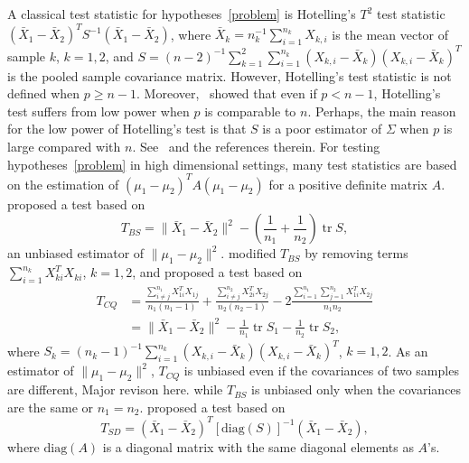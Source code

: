 \documentclass[review]{elsarticle}
\DeclareMathOperator{\mytr}{tr}
\theoremstyle{plain}
\theoremstyle{definition}
\theoremstyle{remark}
\begin{document}
A classical test statistic for hypotheses~\eqref{problem} is Hotelling's $T^2$ test  statistic ${(\bar{X}_1-\bar{X}_2)}^T S^{-1}(\bar{X}_1-\bar{X}_2)$, where $\bar{X}_k=n_k^{-1}\sum_{i=1}^{n_k}X_{k,i}$ is the mean vector of sample $k$, $k=1,2$, and
    $
    S=
{(n-2)}^{-1}\sum_{k=1}^2\sum_{i=1}^{n_k} (X_{k,i}-\bar{X}_k) {(X_{k,i}-\bar{X}_k)}^T
    $
is the pooled sample covariance matrix.
However, Hotelling's test statistic is not defined when $p\geq n-1$.
Moreover,~\cite{Bai1996Efiect} showed that even if $p<n-1$, Hotelling's test suffers from low power when $p$ is comparable to $n$.
Perhaps, the main reason for the low power of Hotelling's test is that $S$ is a poor estimator of $\Sigma$ when $p$ is large compared with $n$. See~\cite{Chen2010A} and the references therein.
For testing hypotheses~\eqref{problem} in high dimensional settings,  
many test statistics are based on the estimation of  ${(\mu_1-\mu_2)}^T A(\mu_1-\mu_2)$ for a positive definite matrix $A$.~\cite{Bai1996Efiect} proposed a test based on
\begin{equation*}
    T_{BS}=\|\bar{X}_1-\bar{X}_2\|^2-(\frac{1}{n_1}+\frac{1}{n_2})\mytr S,
\end{equation*}
an unbiased estimator of $\|\mu_1-\mu_2\|^2$.
\cite{Chen2010A} modified $T_{BS}$ by removing terms $\sum_{i=1}^{n_k}X_{ki}^T X_{ki}$, $k=1,2$, and proposed a test based on
\begin{equation*}
    \begin{aligned}
        T_{CQ}&=\frac{\sum_{i\neq j}^{n_1}X_{1i}^T X_{1j}}{n_1(n_1-1)}+\frac{\sum_{i\neq j}^{n_2}X_{2i}^T X_{2j}}{n_2(n_2-1)}-2\frac{\sum_{i=1}^{n_1}\sum_{j=1}^{n_2}X_{1i}^T X_{2j}}{n_1n_2}
        \\
            &=\|\bar{X}_1-\bar{X}_2\|^2-\frac{1}{n_1}\mytr S_1-\frac{1}{n_2}\mytr S_2,
    \end{aligned}
\end{equation*}
where
$S_k={(n_k -1)}^{-1}\sum_{i=1}^{n_k} (X_{k,i}-\bar{X}_k) {(X_{k,i}-\bar{X}_k)}^T
$, $k=1,2$.
As an estimator of $\|\mu_1-\mu_2\|^2$, $T_{CQ}$ is unbiased even if the covariances of two samples are different,
{\color{red}Major revison here.}
while $T_{BS}$ is unbiased only when the covariances are the same or $n_1=n_2$.
\cite{Srivastava2008A} proposed a test based on
\begin{equation*}
    T_{SD}={(\bar{X}_1-\bar{X}_2)}^T {[\mathrm{diag}(S)]}^{-1}(\bar{X}_1-\bar{X}_2),
\end{equation*}
where $\textrm{diag} (A)$ is a diagonal matrix with the same diagonal elements as $A$'s.
\end{document}
